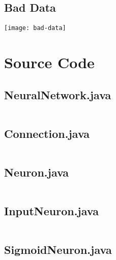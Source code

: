 \documentclass[10pt, a4paper]{article}
\begin{document}
\begin{appendices}
	\subsection{Bad Data}
	\label{appendix:bad-data}
	\texttt{[image: bad-data]}
	
	\newpage
	\section{Source Code}
	\subsection{NeuralNetwork.java}
	\label{appendix:neuralnetwork.java}
	\inputminted[breaklines,frame=single, fontsize=\scriptsize, linenos=true]{java}{../Source/src/main/java/pro/zackpollard/university/aicoursework/NeuralNetwork.java}
	
	\subsection{Connection.java}
	\label{appendix:connection.java}
	\inputminted[breaklines,frame=single, fontsize=\scriptsize, linenos=true]{java}{../Source/src/main/java/pro/zackpollard/university/aicoursework/Connection.java}
	
	\newpage
	\subsection{Neuron.java}
	\label{appendix:neuron.java}
	\inputminted[breaklines,frame=single, fontsize=\scriptsize, linenos=true]{java}{../Source/src/main/java/pro/zackpollard/university/aicoursework/Neuron.java}
	
	\subsection{InputNeuron.java}
	\label{appendix:inputneuron.java}
	\inputminted[breaklines,frame=single, fontsize=\scriptsize, linenos=true]{java}{../Source/src/main/java/pro/zackpollard/university/aicoursework/InputNeuron.java}
	
	\subsection{SigmoidNeuron.java}
	\label{appendix:sigmoidneuron.java}
	\inputminted[breaklines,frame=single, fontsize=\scriptsize, linenos=true]{java}{../Source/src/main/java/pro/zackpollard/university/aicoursework/SigmoidNeuron.java}
	
\end{appendices}
\end{document}

